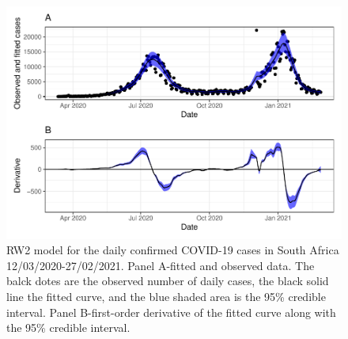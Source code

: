 \documentclass[10pt,letterpaper]{article}
\begin{document}
\begin{figure}[h]
	\includegraphics[width=0.95\linewidth]{COVIDincidenceSA_files/figure-latex/unnamed-chunk-7-1} \caption{RW2 model for the daily confirmed COVID-19 cases in South Africa 12/03/2020-27/02/2021.  Panel A-fitted and observed data. The balck dotes are the observed number of daily cases, the black solid line the fitted curve, and the blue shaded area is the 95\% credible interval. Panel B-first-order derivative of the fitted curve along with the 95\% credible interval.}\label{fig:rw2fitted}
\end{figure}
\end{document}
